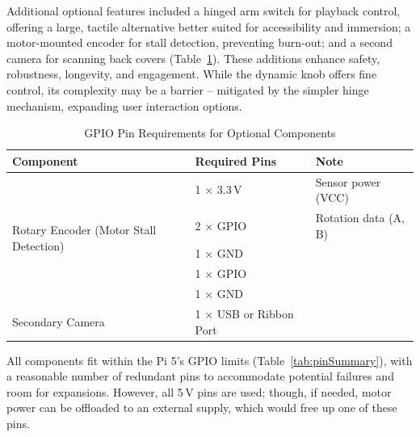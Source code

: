                 Additional optional features included a hinged arm switch for playback control, offering a large, tactile alternative better suited for accessibility and immersion; a motor-mounted encoder for stall detection, preventing burn-out; and a second camera for scanning back covers (Table~\ref{tab:optionalGPIOPins}). These additions enhance safety, robustness, longevity, and engagement. While the dynamic knob offers fine control, its complexity may be a barrier -- mitigated by the simpler hinge mechanism, expanding user interaction options.
    
                \begin{table}[htbp]
                    \centering
                    \caption{GPIO Pin Requirements for Optional Components}
                    \label{tab:optionalGPIOPins}
                    \begin{tabular}{|l|l|l|}
                        \hline
                        \textbf{Component} & \textbf{Required Pins} & \textbf{Note}\\ \hline
                        \multirow{5}{*}{Rotary Encoder (Motor Stall Detection)} & 1 × 3.3\,V & Sensor power (VCC)\\ \cline{2-3}
                                                                                & 2 × GPIO & Rotation data (A, B) \\ \cline{2-3}
                                                                                & 1 × GND & \\ \hline
                        \multirow{2}{*}{Hinge Switch} & 1 × GPIO & \\ \cline{2-3}
                                                      & 1 × GND & \\ \hline
                        Secondary Camera & 1 × USB or Ribbon Port & \\ \hline
                    \end{tabular}
                \end{table}
    
                All components fit within the Pi 5's GPIO limits (Table~\ref{tab:pinSummary}), with a reasonable number of redundant pins to accommodate potential failures and room for expansions. However, all 5\,V pins are used; though, if needed, motor power can be offloaded to an external supply, which would free up one of these pins.
    
